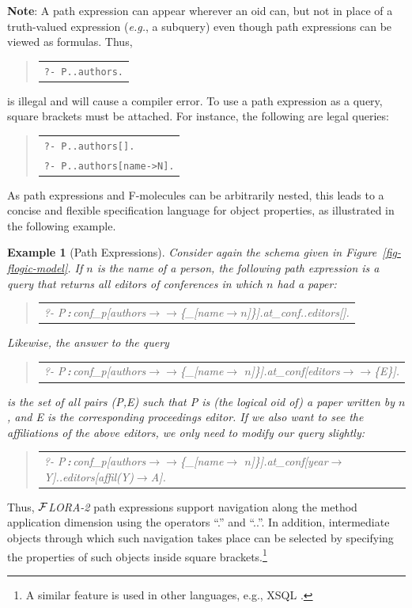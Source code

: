 \documentclass[11pt]{article}
\newtheorem{example}{Example}[section]
\newenvironment{qrules}{\begin{quote}\tt\begin{tabular}[t]{l}}%
{\end{tabular}\end{quote}}
\newcommand{\isa}{\,{\bf{:}}\,}
\newcommand{\fd}{\ensuremath{{\rightarrow}}}                   %
\newcommand{\mvd}{\ensuremath{{\rightarrow\!\!\!\!\rightarrow}}}  %
\newcommand{\anon}{\_}
\newcommand{\FLORA}{{\mbox{${\cal F}${\small\it LORA}\rm\emph{-2}}}\xspace}
\begin{document}
{\bf Note}: A path expression can appear wherever an oid can, but not in
place of a truth-valued expression ({\it e.g.}, a subquery) even though
path expressions can be viewed as formulas. Thus,
\begin{qrules}
\tt ?- P..authors.
\end{qrules}
is illegal and will cause a compiler error. To use a path expression as a
query, square brackets must be attached. For instance, the following are
legal queries:
\begin{qrules}
   \tt ?- P..authors[]. \\
   \tt ?- P..authors[name->N].
\end{qrules}

As path expressions and F-molecules can be arbitrarily nested, this leads
to a concise and flexible specification language for object properties, as
illustrated in the following example.

\begin{example}[Path Expressions]\label{Ex:PathExpr}
  \rm Consider again the schema given in Figure~\ref{fig-flogic-model}.  If
  $n$ is the name of a person, the following path expression is a query
  that returns all editors of conferences in which $n$ had a paper:
  \begin{qrules}
    ?- P\isa conf\_p[authors\mvd\{\anon [name\fd $n$]\}].at\_conf..editors[].
  \end{qrules}
  Likewise, the answer to the query
  \begin{qrules}
    ?- P\isa conf\_p[authors\mvd\{\anon [name\fd
    $n$]\}].at\_conf[editors\mvd\{E\}].
  \end{qrules}
  is the set of all pairs (\textsf{P},\textsf{E}) such that \textsf{P} is
  (the logical oid of) a paper written by $n$, and \textsf{E} is the
  corresponding proceedings editor.  If we also want to see the
  affiliations of the above editors, we only need to modify our query
  slightly:
  \begin{qrules}
    ?- P\isa conf\_p[authors\mvd\{\anon [name\fd
    $n$]\}].at\_conf[year\fd Y]..editors[affil(Y)\fd A].
  \end{qrules}
\end{example}
Thus, \FLORA path expressions support navigation 
along the method application dimension using the operators
``.''  and
``..''. In addition, intermediate objects through which such navigation
takes place can be selected by specifying the properties of such objects
inside square brackets.\footnote{
  A similar feature is used in other languages, e.g., XSQL \cite{xsql-92}.
  }
\end{document}
